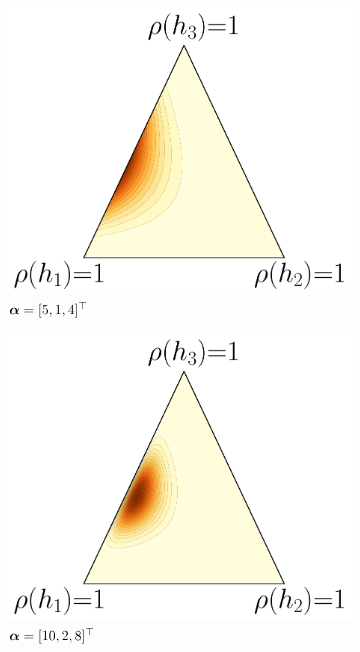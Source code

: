 \begin{figure}
\begin{subfigure}{0.32\textwidth}
    \includegraphics[width=\textwidth]{chapter_5/figures/dirichlet_5_1_4.pdf}
    \caption{$\boldsymbol{\alpha}=[5, 1, 4]^{\top}$}
\end{subfigure}
\hfill
\begin{subfigure}{0.32\textwidth}
    \includegraphics[width=\textwidth]{chapter_5/figures/dirichlet_10_2_8.pdf}
    \caption{$\boldsymbol{\alpha}=[10, 2, 8]^{\top}$}
\end{subfigure}
\hfill
\begin{subfigure}{0.32\textwidth}

\end{subfigure}
\end{figure}
